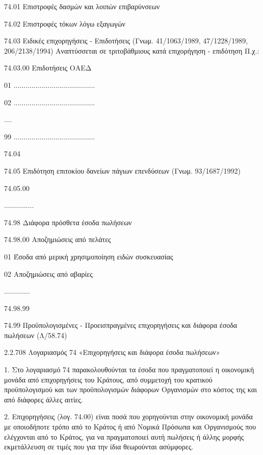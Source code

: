 \documentclass[A4,10pt,greek]{book}
\begin{document}
        74.01    Επιστροφές δασμών και λοιπών επιβαρύνσεων 

        74.02    Επιστροφές τόκων λόγω εξαγωγών 

        74.03    Ειδικές επιχορηγήσεις - Επιδοτήσεις
                    (Γνωμ. 41/1063/1989, 47/1228/1989, 206/2138/1994)
                      Αναπτύσσεται σε τριτοβάθμιους κατά επιχορήγηση - επιδότηση Π.χ.:

                     74.03.00    Επιδοτήσεις ΟΑΕΔ

                               01    .........................................

                               02    .........................................

                               ....

                               99    .........................................

        74.04

        74.05    Επιδότηση επιτοκίου δανείων πάγιων επενδύσεων
                        (Γνωμ. 93/1687/1992)

                     74.05.00

                     ...............

        74.98    Διάφορα πρόσθετα έσοδα πωλήσεων

                     74.98.00    Αποζημιώσεις από πελάτες

                               01    Έσοδα από μερική χρησιμοποίηση ειδών συσκευασίας

                               02    Αποζημιώσεις από αβαρίες

                     .............

                     74.98.99

        74.99    Προϋπολογισμένες - Προεισπραγμένες επιχορηγήσεις και
                     διάφορα έσοδα πωλήσεων (Λ/58.74)

2.2.708 Λογαριασμός 74 «Επιχορηγήσεις και διάφορα έσοδα πωλήσεων»

1. Στο λογαριασμό 74 παρακολουθούνται τα έσοδα που πραγματοποιεί η οικονομική μονάδα από επιχορηγήσεις του Κράτους, από συμμετοχή του κρατικού προϋπολογισμού και των προϋπολογισμών διάφορων Οργανισμών στο κόστος της και από διάφορες άλλες αιτίες.

2. Επιχορηγήσεις (λογ. 74.00) είναι ποσά που χορηγούνται στην οικονομική μονάδα με οποιοδήποτε τρόπο από το Κράτος ή από Νομικά Πρόσωπα και Οργανισμούς που ελέγχονται από το Κράτος, για να πραγματοποιεί αυτή πωλήσεις ή άλλης μορφής εκμετάλλευση σε τιμές που για την ίδια θεωρούνται ασύμφορες. 
\end{document}
